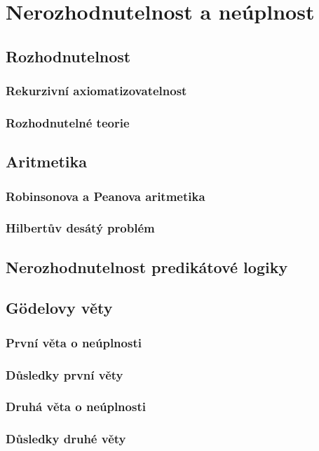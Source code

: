 \chapter{Nerozhodnutelnost a neúplnost}


\section{Rozhodnutelnost}

\subsection{Rekurzivní axiomatizovatelnost}

\subsection{Rozhodnutelné teorie}


\section{Aritmetika}

\subsection{Robinsonova a Peanova aritmetika}

\subsection{Hilbertův desátý problém}


\section{Nerozhodnutelnost predikátové logiky}


\section{Gödelovy věty}

\subsection{První věta o neúplnosti}

\subsection{Důsledky první věty}

\subsection{Druhá věta o neúplnosti}

\subsection{Důsledky druhé věty}



